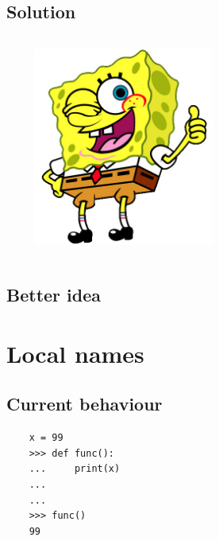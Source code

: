 \documentclass{beamer}
\begin{document}
\subsection{Solution}
\begin{frame}
        
        \pause
    \begin{columns}
        \begin{column}{0.48\textwidth}
            
        \end{column}
        \begin{column}{0.48\textwidth}
            \pause
            \includegraphics[width=0.48\textwidth]{images/ok.jpg}
        \end{column}
    \end{columns}
\end{frame}

\subsection{Better idea}
\begin{frame}

\end{frame}

\section{Local names}
\subsection{Current behaviour}
\begin{frame}[fragile]
\begin{center}
\structure{\insertsection}
\end{center}
    \begin{lstlisting}
    x = 99
    >>> def func():
    ...     print(x)
    ...
    ...
    >>> func()
    99
    \end{lstlisting}
\end{frame}
\end{document}
